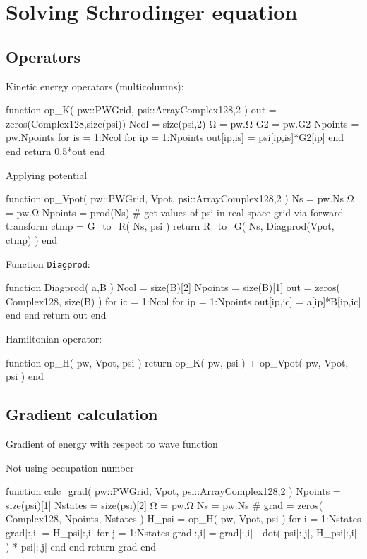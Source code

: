 \section{Solving Schrodinger equation}

\subsection{Operators}

Kinetic energy operators (multicolumns):

\begin{juliacode}
function op_K( pw::PWGrid, psi::Array{Complex128,2} )
  out = zeros(Complex128,size(psi))
  Ncol = size(psi,2)
  Ω = pw.Ω
  G2 = pw.G2
  Npoints = pw.Npoints
  for is = 1:Ncol
    for ip = 1:Npoints
      out[ip,is] = psi[ip,is]*G2[ip]
    end
  end
  return 0.5*out
end
\end{juliacode}

Applying potential

\begin{juliacode}
function op_Vpot( pw::PWGrid, Vpot, psi::Array{Complex128,2} )
  Ns = pw.Ns
  Ω = pw.Ω
  Npoints = prod(Ns)
  # get values of psi in real space grid via forward transform
  ctmp = G_to_R( Ns, psi )
  return R_to_G( Ns, Diagprod(Vpot, ctmp) )
end
\end{juliacode}

Function {\tt Diagprod}:

\begin{juliacode}
function Diagprod( a,B )
  Ncol    = size(B)[2]
  Npoints = size(B)[1]
  out = zeros( Complex128, size(B) )
  for ic = 1:Ncol
    for ip = 1:Npoints
      out[ip,ic] = a[ip]*B[ip,ic]
    end
  end
  return out
end
\end{juliacode}

Hamiltonian operator:

\begin{juliacode}
function op_H( pw, Vpot, psi )
  return op_K( pw, psi ) + op_Vpot( pw, Vpot, psi )
end
\end{juliacode}


\subsection{Gradient calculation}

Gradient of energy with respect to wave function

Not using occupation number

\begin{juliacode}
function calc_grad( pw::PWGrid, Vpot, psi::Array{Complex128,2} )
  Npoints = size(psi)[1]
  Nstates = size(psi)[2]
  Ω = pw.Ω
  Ns = pw.Ns
  #
  grad = zeros( Complex128, Npoints, Nstates )
  H_psi = op_H( pw, Vpot, psi )
  for i = 1:Nstates
    grad[:,i] = H_psi[:,i]
    for j = 1:Nstates
      grad[:,i] = grad[:,i] - dot( psi[:,j], H_psi[:,i] ) * psi[:,j]
    end
  end
  return grad
end
\end{juliacode}




